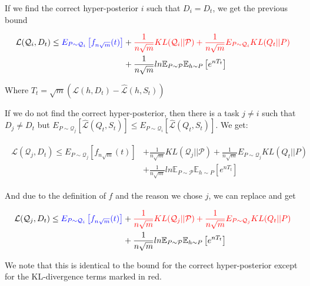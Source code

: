 \documentclass[letterpaper]{article}
\theoremstyle{definition}
\begin{document}
If we find the correct hyper-posterior $i$ such that $D_i=D_t$, we get the previous bound

\begin{align*}
\begin{split}
\mathcal{L}(\mathcal{Q}_i, D_t)\leq \textcolor{blue}{ E_{P\sim \mathcal{Q}_i} \left [ f_{n\sqrt{m}}(t)\right ]} & + \textcolor{red}{\frac{1}{n\sqrt{m}} KL(\mathcal{Q}_i||\mathcal{P}) +\frac{1}{n\sqrt{m}}E_{P\sim \mathcal{Q}_i} KL(Q_t||P)} \\&+ \frac{1}{n\sqrt{m}} ln\mathbb{E}_{P\sim \mathcal{P}}\mathbb{E}_{h\sim P}\left [ e^{nT_t} \right ]
\end{split}
\end{align*}

Where $T_t=\sqrt{m}(\mathcal{L}(h, D_t)-\hat{\mathcal{L}}(h,S_t))$

If we do not find the correct hyper-posterior, then there is a task $j\neq i$ such that $D_j\neq D_t$ but $E_{P\sim\mathcal{Q}_j}\left [\hat{\mathcal{L}}(Q_t, S_t)\right ]\leq E_{P\sim\mathcal{Q}_i}\left [\hat{\mathcal{L}}(Q_t, S_t)\right ]$. We get:

\begin{align*}
\begin{split}
\mathcal{L}(\mathcal{Q}_j, D_t)\leq E_{P\sim \mathcal{Q}_j} \left [ f_{n\sqrt{m}}(t)\right ] & + \frac{1}{n\sqrt{m}} KL(\mathcal{Q}_j||\mathcal{P}) +\frac{1}{n\sqrt{m}}E_{P\sim \mathcal{Q}_j} KL(Q_t||P) \\& + \frac{1}{n\sqrt{m}} ln\mathbb{E}_{P\sim \mathcal{P}}\mathbb{E}_{h\sim P}\left [ e^{nT_t} \right ]
\end{split}
\end{align*}

And due to the definition of $f$ and the reason we chose $j$, we can replace and get 

\begin{align*}
\begin{split}
\mathcal{L}(\mathcal{Q}_j, D_t)\leq \textcolor{blue}{E_{P\sim \mathcal{Q}_i} \left [ f_{n\sqrt{m}}(t)\right ]} & + \textcolor{red}{\frac{1}{n\sqrt{m}} KL(\mathcal{Q}_j||\mathcal{P}) +\frac{1}{n\sqrt{m}}E_{P\sim \mathcal{Q}_j} KL(Q_t||P)} \\&+ \frac{1}{n\sqrt{m}} ln\mathbb{E}_{P\sim \mathcal{P}}\mathbb{E}_{h\sim P}\left [ e^{nT_t} \right ]
\end{split}
\end{align*}

We note that this is identical to the bound for the correct hyper-posterior except for the KL-divergence terms marked in red.
\end{document}
